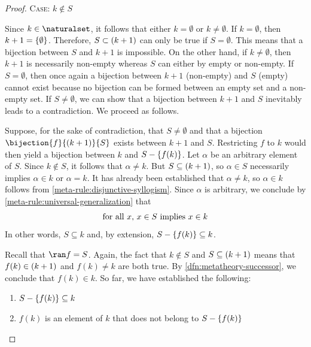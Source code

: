 \begin{proof}
    \vspace{0.3cm}
    \noindent
    {\scshape Case}: \( k \notin S \)

    \vspace{0.1cm}
    \noindent
    Since \( k \in \naturalset \), it follows that either \( k = \emptyset \) or \( k \neq \emptyset \).
    If \( k = \emptyset \), then \( k + 1 = \mleft\{ \emptyset \mright\} \).
    Therefore, \( S \subset \mleft( k + 1 \mright) \) can only be true if \( S = \emptyset \).
    This means that a bijection between \( S \) and \( k + 1 \) is impossible.
    On the other hand, if \( k \neq \emptyset \), then \( k + 1 \) is necessarily non-empty whereas \( S \) can either by
    empty or non-empty.
    If \( S = \emptyset \), then once again a bijection between \( k + 1 \) (non-empty) and \( S \) (empty) cannot exist because no bijection can be formed between an empty set
    and a non-empty set.
    If \( S \neq \emptyset \), we can show that a bijection between \( k + 1 \) and \( S \) inevitably leads to a contradiction.
    We proceed as follows.

    \vspace{0.3cm}
    \noindent
    Suppose, for the sake of contradiction, that \( S \neq \emptyset \) and that a bijection \( \bijection{f}{\mleft( k + 1 \mright)}{S} \) exists between \( k + 1 \) and \( S \).
    Restricting \( f \) to \( k \) would then yield a bijection between \( k \) and \( S - \mleft\{ f(k) \mright\} \).
    Let \( \alpha \) be an arbitrary element of \( S \).
    Since \( k \notin S \), it follows that \( \alpha \neq k \).
    But \( S \subseteq \mleft( k + 1 \mright) \), so \( \alpha \in S \) necessarily implies \( \alpha \in k \) or \( \alpha = k \).
    It has already been established that \( \alpha \neq k \), so \( \alpha \in k \) follows from \cref{meta-rule:disjunctive-syllogism}.
    Since \( \alpha \) is arbitrary, we conclude by \cref{meta-rule:universal-generalization} that
    \begin{equation*}
        \text{for all \( x \), \( x \in S \) implies \( x \in k \)}
    \end{equation*}
    In other words, \( S \subseteq k \) and, by extension, \( S - \mleft\{ f(k) \mright\} \subseteq k \).

    \vspace{0.3cm}
    \noindent
    Recall that \( \ran f = S \). Again, the fact that \( k \notin S \) and \( S \subseteq \mleft( k + 1 \mright) \)
    means that \( f(k) \in \mleft( k + 1 \mright) \) and \( f(k) \neq k \) are both true.
    By \cref{dfn:metatheory-successor}, we conclude that \( f(k) \in k \).
    So far, we have established the following:
    \begin{enumerate}[topsep=2pt, label=\textup{\texttt{(\alph*)}}]
        \item \( S - \mleft\{ f(k) \mright\} \subseteq k \)
        \item \( f(k) \) is an element of \( k \) that does not belong to \( S - \mleft\{ f(k) \mright\} \)
    \end{enumerate}
    

\end{proof}
